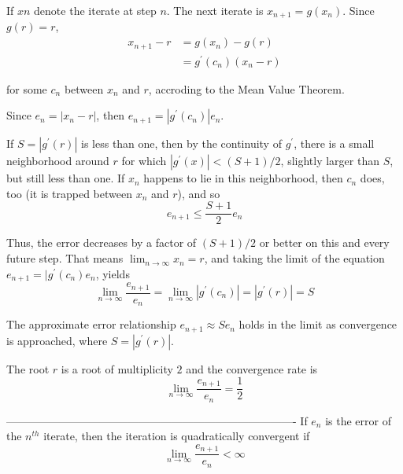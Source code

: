 \documentclass[a4paper,11pt]{report}
\begin{document}
\begin{enumerate}
    If $x{n}$ denote the iterate at step $n$. The next iterate is $x_{n+1} = g(x_{n})$. Since $g(r) = r$,
    \begin{equation*}
    \begin{aligned}
    x_{n+1} - r &= g(x_{n}) - g(r) \\
    &= g^{\prime}(c_{n})(x_{n} - r)
    \end{aligned}
    \end{equation*}

    for some $c_{n}$ between $x_{n}$ and $r$, accroding to the Mean Value 
    Theorem. 
    
    Since $e_{n} = |x_{n} - r|$, then $e_{n+1} = |g^{\prime}(c_{n})|e_{n}$.

    If $S = |g^{\prime}(r)|$ is less than one, then by the continuity of 
    $g^{\prime}$, there is a small neighborhood around $r$ for which 
    $|g^{\prime}(x)| < (S+1)/2$, slightly larger than $S$, but still less than 
    one. If $x_{n}$ happens to lie in this neighborhood, then $c_{n}$ does, too
    (it is trapped between $x_{n}$ and $r$), and so
    \begin{equation*}
    e_{n+1} \leq \frac{S+1}{2}e_{n}
    \end{equation*}
      
    Thus, the error decreases by a factor of $(S+1)/2$ or better on this and
    every future step. That means $\lim_{n \rightarrow \infty} x_{n} = r$, and
    taking the limit of the equation $e_{n+1} = |g^{\prime}(c_{n})e_{n}$, yields
    \begin{equation*}
    \lim_{n \rightarrow \infty} \frac{e_{n+1}}{e_{n}} = \lim_{n \rightarrow \infty} |g^{\prime}(c_{n})| = |g^{\prime}(r)| = S
    \end{equation*}

    The approximate error relationship $e_{n+1} \approx Se_{n}$ holds in the
    limit as convergence is approached, where $S = |g^{\prime}(r)|$.

    The root $r$ is a root of multiplicity $2$ and the convergence rate is
    \begin{equation*}
    \lim_{n \rightarrow \infty} \frac{e_{n+1}}{e_{n}} = \frac{1}{2}
    \end{equation*}

-------------------------------------------------------------------------------
    If $e_{n}$ is the error of the $n^{th}$ iterate, then the iteration is
    quadratically convergent if
    \begin{equation*}
    \lim_{n \rightarrow \infty} \frac{e_{n+1}}{e_{n}} < \infty
    \end{equation*}


\end{enumerate}
\end{document}

